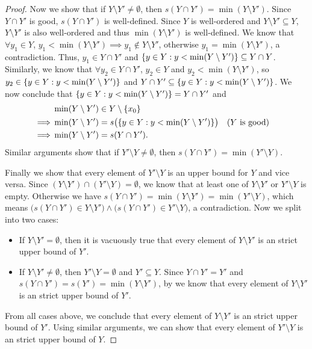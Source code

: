 \begin{proof}
  Now we show that if \(Y \setminus Y' \neq \emptyset\), then \(s(Y \cap Y') = \min(Y \setminus Y')\).
  Since \(Y \cap Y'\) is good, \(s(Y \cap Y')\) is well-defined.
  Since \(Y\) is well-ordered and \(Y \setminus Y' \subseteq Y\), \(Y \setminus Y'\) is also well-ordered and thus \(\min(Y \setminus Y')\) is well-defined.
  We know that \(\forall y_1 \in Y\), \(y_1 < \min(Y \setminus Y') \implies y_1 \notin Y \setminus Y'\), otherwise \(y_1 = \min(Y \setminus Y')\), a contradiction.
  Thus, \(y_1 \in Y \cap Y'\) and \(\left\lbrace y \in Y : y < \min(Y \setminus Y')\right\rbrace \subseteq Y \cap Y\).
  Similarly, we know that \(\forall y_2 \in Y \cap Y'\), \(y_2 \in Y\) and \(y_2 < \min(Y \setminus Y')\), so \(y_2 \in \left\lbrace y \in Y : y < \min(Y \setminus Y')\right\rbrace\) and \(Y \cap Y' \subseteq \left\lbrace y \in Y : y < \min(Y \setminus Y')\right\rbrace\).
  We now conclude that \(\left\lbrace y \in Y : y < \min(Y \setminus Y')\right\rbrace = Y \cap Y'\) and
  \begin{align*}
             & \min(Y \setminus Y') \in Y \setminus \set{x_0}                                                         \\
    \implies & \min(Y \setminus Y') = s\big(\set{y \in Y : y < \min(Y \setminus Y')}\big) &  & \text{(\(Y\) is good)} \\
    \implies & \min(Y \setminus Y') = s(Y \cap Y').
  \end{align*}
  Similar arguments show that if \(Y' \setminus Y \neq \emptyset\), then \(s(Y \cap Y') = \min(Y' \setminus Y)\).

  Finally we show that every element of \(Y' \setminus Y\) is an upper bound for \(Y\) and vice versa.
  Since \((Y \setminus Y') \cap (Y' \setminus Y) = \emptyset\), we know that at least one of \(Y \setminus Y'\) or \(Y' \setminus Y\) is empty.
  Otherwise we have \(s(Y \cap Y') = \min(Y \setminus Y') = \min(Y' \setminus Y)\), which means \(\big(s(Y \cap Y') \in Y \setminus Y'\big) \land \big(s(Y \cap Y') \in Y' \setminus Y\big)\), a contradiction.
  Now we split into two cases:
  \begin{itemize}
    \item If \(Y \setminus Y' = \emptyset\), then it is vacuously true that every element of \(Y \setminus Y'\) is an strict upper bound of \(Y'\).
    \item If \(Y \setminus Y' \neq \emptyset\), then \(Y' \setminus Y = \emptyset\) and \(Y' \subseteq Y\).
          Since \(Y \cap Y' = Y'\) and \(s(Y \cap Y') = s(Y') = \min(Y \setminus Y')\), by  we know that every element of \(Y \setminus Y'\) is an strict upper bound of \(Y'\).
  \end{itemize}
  From all cases above, we conclude that every element of \(Y \setminus Y'\) is an strict upper bound of \(Y'\).
  Using similar arguments, we can show that every element of \(Y' \setminus Y\) is an strict upper bound of \(Y\).
\end{proof}

